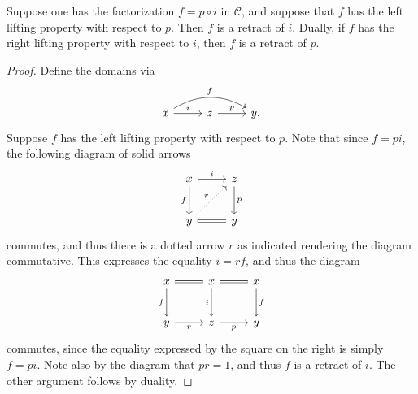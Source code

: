 \begin{lemma}\label{1.1.17}
	Suppose one has the factorization $f=p\circ i$ in $\mathcal{C} $, and suppose that $f$ has the left lifting property with respect to $p$. Then $f$ is a retract of $i$. Dually, if $f$ has the right lifting property with respect to $i$, then $f$ is a retract of $p$.
\end{lemma}
\begin{proof}
	Define the domains via
	\[\begin{tikzcd}[row sep = 2.5em, column sep = 2.5em]
	x \ar[" i ", r] \ar[" f ", bend left, rr]  & z \ar[" p ", r]  & y.
	\end{tikzcd}\]
	Suppose $f$ has the left lifting property with respect to $p$. Note that since $f=pi$, the following diagram of solid arrows
	\[\begin{tikzcd}[row sep = 2.5em, column sep = 2.5em]
	x \ar[" f "', d] \ar[" i ", , r]  & z\ar[" p ", d]  \\
	y \ar[equals, r] \ar[" r ", dotted, ur]  & y
	\end{tikzcd}\]
	commutes, and thus there is a dotted arrow $r$ as indicated rendering the diagram commutative. This expresses the equality $i=rf$, and thus the diagram
	\[\begin{tikzcd}[row sep = 2.5em, column sep = 2.5em]
	x \ar[equals, r] \ar[" f "', d]  & x \ar[equals, r] \ar[" i "', d]  & x \ar[" f ", d]  \\
	y \ar[" r "', r]  & z \ar[" p "', r]  & y
	\end{tikzcd}\]
	commutes, since the equality expressed by the square on the right is simply $f=pi$. Note also by the diagram that $pr=1$, and thus $f$ is a retract of $i$. The other argument follows by duality.
\end{proof}

